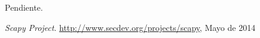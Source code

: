 \documentclass[a4paper, 10pt, twoside]{article}
\begin{document}
\label{foo}

Pendiente.




\begin{thebibliography}{9}

	\emph{Scapy Project}.
	\url{http://www.secdev.org/projects/scapy}, 
	Mayo de 2014
	
\end{thebibliography}
\end{document}
